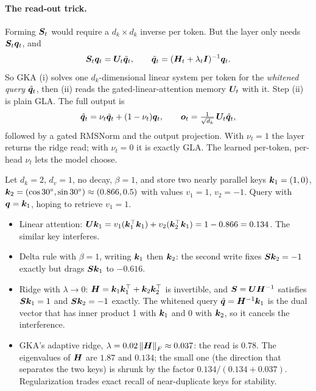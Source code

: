 \paragraph{The read-out trick.} Forming $\bm{S}_t$ would require a $d_k\times d_k$ inverse per token.
But the layer only needs $\bm{S}_t\bm{q}_t$, and
\begin{equation}\label{eq:c08-gka-read}
  \bm{S}_t\bm{q}_t=\bm{U}_t\tilde{\bm{q}}_t,\qquad \tilde{\bm{q}}_t=(\bm{H}_t+\lambda_t\bm{I})^{-1}\bm{q}_t .
\end{equation}
So GKA (i) solves one $d_k$-dimensional linear system per token for the \emph{whitened query}
$\tilde{\bm{q}}_t$, then (ii) reads the gated-linear-attention memory $\bm{U}_t$ with it. Step (ii) is plain
GLA. The full output is
\begin{equation}\label{eq:c08-gka-out}
  \hat{\bm{q}}_t=\nu_t\tilde{\bm{q}}_t+(1-\nu_t)\bm{q}_t,\qquad \bm{o}_t=\tfrac{1}{\sqrt{d_k}}\,\bm{U}_t\hat{\bm{q}}_t ,
\end{equation}
followed by a gated RMSNorm and the output projection. With $\nu_t=1$ the layer returns the ridge
read; with $\nu_t=0$ it is exactly GLA. The learned per-token, per-head $\nu_t$ lets the model choose.

\begin{example}\label{ex:c08-whiten}
Let $d_k=2$, $d_v=1$, no decay, $\beta=1$, and store two nearly parallel keys
$\bm{k}_1=(1,0)$, $\bm{k}_2=(\cos30^\circ,\sin30^\circ)\approx(0.866,0.5)$ with values $v_1=1$, $v_2=-1$.
Query with $\bm{q}=\bm{k}_1$, hoping to retrieve $v_1=1$.
\begin{itemize}
  \item Linear attention: $\bm{U}\bm{k}_1=v_1(\bm{k}_1^{\top}\bm{k}_1)+v_2(\bm{k}_2^{\top}\bm{k}_1)=1-0.866=0.134$. The
  similar key interferes.
  \item Delta rule with $\beta=1$, writing $\bm{k}_1$ then $\bm{k}_2$: the second write fixes
  $\bm{S}\bm{k}_2=-1$ exactly but drags $\bm{S}\bm{k}_1$ to $-0.616$.
  \item Ridge with $\lambda\to0$: $\bm{H}=\bm{k}_1\bm{k}_1^{\top}+\bm{k}_2\bm{k}_2^{\top}$ is invertible, and $\bm{S}=\bm{U}\bm{H}^{-1}$
  satisfies $\bm{S}\bm{k}_1=1$ and $\bm{S}\bm{k}_2=-1$ exactly. The whitened query
  $\tilde{\bm{q}}=\bm{H}^{-1}\bm{k}_1$ is the dual vector that has inner product 1 with $\bm{k}_1$ and 0 with
  $\bm{k}_2$, so it cancels the interference.
  \item GKA's adaptive ridge, $\lambda=0.02\left\lVert \bm{H}\right\rVert_F\approx0.037$: the read is $0.78$. The
  eigenvalues of $\bm{H}$ are $1.87$ and $0.134$; the small one (the direction that separates the two
  keys) is shrunk by the factor $0.134/(0.134+0.037)$. Regularization trades exact recall of
  near-duplicate keys for stability.
\end{itemize}
\end{example}

